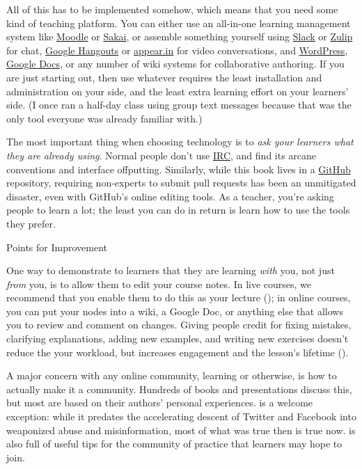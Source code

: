 All of this has to be implemented somehow, which means that you need
some kind of teaching platform.  You can either use an all-in-one
learning management system like \href{http://moodle.org}{Moodle} or
\href{https://www.sakaiproject.org/}{Sakai}, or assemble something
yourself using \href{http://slack.com}{Slack} or
\href{https://zulipchat.com/}{Zulip} for chat,
\href{http://hangouts.google.com}{Google Hangouts} or
\href{https://appear.in/}{appear.in} for video conversations, and
\href{https://wordpress.org/}{WordPress},
\href{http://docs.google.com}{Google Docs}, or any number of wiki
systems for collaborative authoring. If you are just starting out,
then use whatever requires the least installation and administration
on your side, and the least extra learning effort on your learners'
side. (I once ran a half-day class using group text messages because
that was the only tool everyone was already familiar with.)

The most important thing when choosing technology is to \emph{ask your
  learners what they are already using}.  Normal people don't use
\href{https://en.wikipedia.org/wiki/Internet_Relay_Chat}{IRC}, and
find its arcane conventions and interface offputting. Similarly, while
this book lives in a \href{http://github.com}{GitHub} repository,
requiring non-experts to submit pull requests has been an unmitigated
disaster, even with GitHub's online editing tools. As a teacher,
you're asking people to learn a lot; the least you can do in return is
learn how to use the tools they prefer.

\begin{callout}{Points for Improvement}

  One way to demonstrate to learners that they are learning
  \emph{with} you, not just \emph{from} you, is to allow them to edit
  your course notes. In live courses, we recommend that you enable
  them to do this as your lecture ();
  in online courses, you can put your nodes into a wiki, a Google Doc,
  or anything else that allows you to review and comment on changes.
  Giving people credit for fixing mistakes, clarifying explanations,
  adding new examples, and writing new exercises doesn't reduce the
  your workload, but increases engagement and the lesson's lifetime
  ().

\end{callout}

A major concern with any online community, learning or otherwise, is
how to actually make it a community. Hundreds of books and
presentations discuss this, but most are based on their authors'
personal experiences. \cite{Krau2016} is a welcome exception: while it
predates the accelerating descent of Twitter and Facebook into
weaponized abuse and misinformation, most of what was true then is
true now.  \cite{Foge2005} is also full of useful tips for the
community of practice that learners may hope to join.


